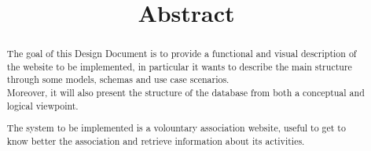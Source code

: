 \documentclass[../DD.tex]{subfiles}
\begin{document}
\title{Abstract}
\begin{abstract}
	The goal of this Design Document is to provide a functional and visual description of the website to be implemented, in particular it wants to describe the main structure through some models, schemas and use case scenarios. \\
	Moreover, it will also present the structure of the database from both a conceptual and logical viewpoint.
	
	The system to be implemented is a volountary association website, useful to get to know better the association and retrieve information about its activities.
\end{abstract}

\thispagestyle{fancy}
	\newpage
		
\end{document}

